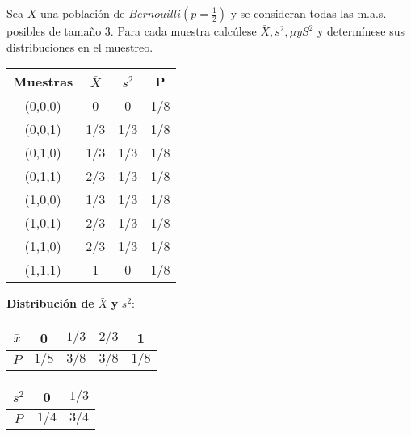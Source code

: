 \begin{problem}{2.1}
	Sea $X$ una población de $Bernouilli(p = \frac{1}{2})$ y se consideran todas las m.a.s. posibles de tamaño 3. Para cada muestra calcúlese $\bar{X}, s^2, \mu y S^2$ y determínese sus distribuciones en el muestreo. 
\end{problem}
\begin{sol}
	\begin{center}
		\begin{tabular}{c c c c}
			\toprule
			\textbf{Muestras} & $\bar{X}$ & $s^2$ & P \\
			\midrule
			(0,0,0)   & 0     & 0     & 1/8 \\
			(0,0,1)   & 1/3   & 1/3   & 1/8 \\
			(0,1,0)   & 1/3   & 1/3   & 1/8 \\
			(0,1,1)   & 2/3   & 1/3   & 1/8 \\
			(1,0,0)   & 1/3   & 1/3   & 1/8 \\
			(1,0,1)   & 2/3   & 1/3   & 1/8 \\
			(1,1,0)   & 2/3   & 1/3   & 1/8 \\
			(1,1,1)   & 1     & 0     & 1/8 \\
			\bottomrule
		\end{tabular}
	\end{center}
	
	\vspace{0.1cm} %
	
	\textbf{Distribución de} $\bar{X}$ \textbf{y} $s^2$:
	
	\vspace{0cm} %
	
	\begin{center}
		\begin{tabular}{c|cccc} 
			$\bar{x}$ & 0 & $1/3$ & $2/3$ & 1 \\
			\hline
			$P$ & $1/8$ & $3/8$ & $3/8$ & $1/8$ \\
		\end{tabular}
		\hspace{1cm} %
		\begin{tabular}{c|cc} 
			$s^2$ & 0 & $1/3$  \\
			\hline
			$P$ & $1/4$ & $3/4$ \\
		\end{tabular}
	\end{center}
\end{sol}
